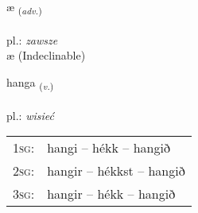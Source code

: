 \documentclass[frontgrid, backgrid]{flacards}\usepackage[]{graphicx}\usepackage[]{xcolor}
\begin{document}

\renewcommand{\flhead}{\vskip5pt \fboxsep=0pt {\small\bfseries\footnotesize Atviksorð | Adverb}}
\renewcommand{\fcfoot}{\vskip5pt \fboxsep=0pt \hspace{2pt}{\small\bfseries\footnotesize 2K}}

\renewcommand{\blhead}{\vskip5pt {\small\bfseries\footnotesize Atviksorð | Adverb }}
\renewcommand{\bcfoot}{\vskip5pt \hspace{2pt}{\small\bfseries\footnotesize 2K}}


{æ \small{\textsubscript{(\textit{adv.})}} \\[1ex]
\textphonetic{[aiː]} \\
pl.: \emph{zawsze} \\  [2ex]
æ (Indeclinable)}

\renewcommand{\flhead}{\vskip5pt \fboxsep=0pt {\small\bfseries\footnotesize Sagnorð | Verb}}
\renewcommand{\fcfoot}{\vskip5pt \fboxsep=0pt \hspace{2pt}{\small\bfseries\footnotesize 2K}}

\renewcommand{\blhead}{\vskip5pt {\small\bfseries\footnotesize Sagnorð | Verb }}
\renewcommand{\bcfoot}{\vskip5pt \hspace{2pt}{\small\bfseries\footnotesize 2K}}


{hanga \small{\textsubscript{(\textit{v.})}} \\[1ex] %
\textphonetic{[hauŋka]} \\
pl.: \emph{wisieć} \\  [2ex]
\renewcommand*{\arraystretch}{0.8}
\begin{tabular}{p{1cm}l}
\textsc{1sg}: & hangi -- hékk -- hangið \\ 
\textsc{2sg}: & hangir -- hékkst -- hangið \\ 
\textsc{3sg}: & hangir -- hékk -- hangið \\ 
\end{tabular}
}

\renewcommand{\flhead}{\vskip5pt \fboxsep=0pt {\small\bfseries\footnotesize Nafnorð | Noun}}
\renewcommand{\fcfoot}{\vskip5pt \fboxsep=0pt \hspace{2pt}{\small\bfseries\footnotesize 2K}}
\end{document}
